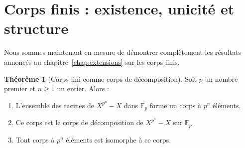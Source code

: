 \documentclass[12pt,a4paper,openany]{book}
\theoremstyle{definition}
\newtheorem{theoreme}{Théorème}[chapter]
\newcommand{\F}{\mathbb{F}}
\begin{document}
\section{Corps finis : existence, unicité et structure}
\label{sec:corps-finis-structure}

Nous sommes maintenant en mesure de démontrer complètement les résultats annoncés
au chapitre~\ref{chap:extensions} sur les corps finis.

\begin{theoreme}[Corps fini comme corps de décomposition]
\label{thm:corps-fini-decomp}
Soit $p$ un nombre premier et $n \geq 1$ un entier. Alors :
\begin{enumerate}[label=(\roman*)]
  \item L'ensemble des racines de $X^{p^n} - X$ dans $\overline{\F_p}$ forme
    un corps à $p^n$ éléments.
  \item Ce corps est le corps de décomposition de $X^{p^n} - X$ sur $\F_p$.
  \item Tout corps à $p^n$ éléments est isomorphe à ce corps.
\end{enumerate}
\end{theoreme}
\end{document}
